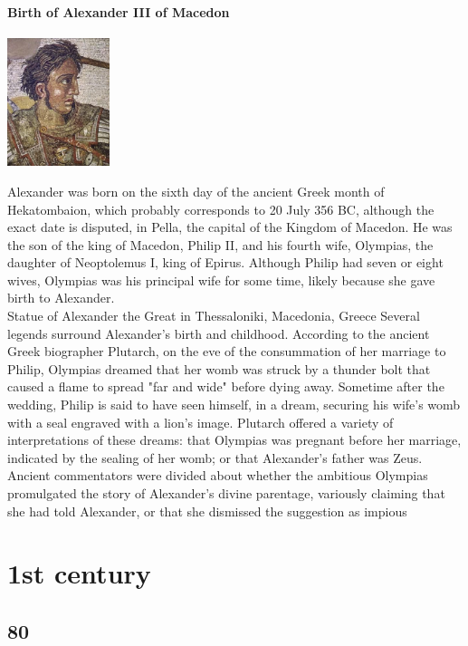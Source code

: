\documentclass[11pt]{report}
\begin{document}
\subsection{Birth of Alexander III of Macedon}
\vspace{2mm}\begin{center}\includegraphics[width=3cm]{./img/alexanderTG.jpg}\end{center}
Alexander was born on the sixth day of the ancient Greek month of Hekatombaion, which probably corresponds to 20 July 356 BC, although the exact date is disputed, in Pella, the capital of the Kingdom of Macedon. He was the son of the king of Macedon, Philip II, and his fourth wife, Olympias, the daughter of Neoptolemus I, king of Epirus. Although Philip had seven or eight wives, Olympias was his principal wife for some time, likely because she gave birth to Alexander.\\
Statue of Alexander the Great in Thessaloniki, Macedonia, Greece
Several legends surround Alexander's birth and childhood. According to the ancient Greek biographer Plutarch, on the eve of the consummation of her marriage to Philip, Olympias dreamed that her womb was struck by a thunder bolt that caused a flame to spread "far and wide" before dying away. Sometime after the wedding, Philip is said to have seen himself, in a dream, securing his wife's womb with a seal engraved with a lion's image. Plutarch offered a variety of interpretations of these dreams: that Olympias was pregnant before her marriage, indicated by the sealing of her womb; or that Alexander's father was Zeus. Ancient commentators were divided about whether the ambitious Olympias promulgated the story of Alexander's divine parentage, variously claiming that she had told Alexander, or that she dismissed the suggestion as impious


\part{1st century}
\chapter{80}
\end{document}
